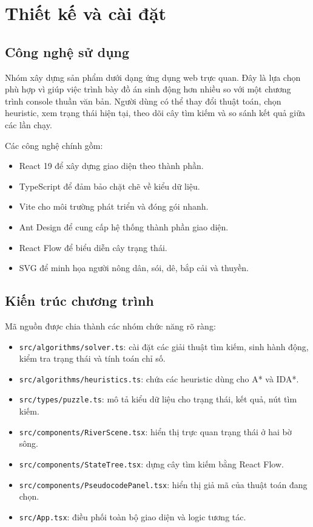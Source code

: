 \documentclass[a4paper,12pt]{article}
\begin{document}
\section{Thiết kế và cài đặt}

\subsection{Công nghệ sử dụng}

Nhóm xây dựng sản phẩm dưới dạng ứng dụng web trực quan. Đây là lựa chọn phù hợp vì giúp việc trình bày đồ án sinh động hơn nhiều so với một chương trình console thuần văn bản. Người dùng có thể thay đổi thuật toán, chọn heuristic, xem trạng thái hiện tại, theo dõi cây tìm kiếm và so sánh kết quả giữa các lần chạy.

Các công nghệ chính gồm:
\begin{itemize}
    \item React 19 để xây dựng giao diện theo thành phần.
    \item TypeScript để đảm bảo chặt chẽ về kiểu dữ liệu.
    \item Vite cho môi trường phát triển và đóng gói nhanh.
    \item Ant Design để cung cấp hệ thống thành phần giao diện.
    \item React Flow để biểu diễn cây trạng thái.
    \item SVG để minh họa người nông dân, sói, dê, bắp cải và thuyền.
\end{itemize}

\subsection{Kiến trúc chương trình}

Mã nguồn được chia thành các nhóm chức năng rõ ràng:
\begin{itemize}
    \item \texttt{src/algorithms/solver.ts}: cài đặt các giải thuật tìm kiếm, sinh hành động, kiểm tra trạng thái và tính toán chỉ số.
    \item \texttt{src/algorithms/heuristics.ts}: chứa các heuristic dùng cho A* và IDA*.
    \item \texttt{src/types/puzzle.ts}: mô tả kiểu dữ liệu cho trạng thái, kết quả, nút tìm kiếm.
    \item \texttt{src/components/RiverScene.tsx}: hiển thị trực quan trạng thái ở hai bờ sông.
    \item \texttt{src/components/StateTree.tsx}: dựng cây tìm kiếm bằng React Flow.
    \item \texttt{src/components/PseudocodePanel.tsx}: hiển thị giả mã của thuật toán đang chọn.
    \item \texttt{src/App.tsx}: điều phối toàn bộ giao diện và logic tương tác.
\end{itemize}
\end{document}
